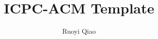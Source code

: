 \documentclass[11pt, a4paper, oneside]{ctexart}
\begin{document}
    \title{ICPC-ACM Template}
    \author{Ruoyi Qiao}
    \maketitle
    \restoregeometry

    \tableofcontents
    \clearpage

    
    \clearpage

    
    \clearpage

    
    \clearpage

    
    \clearpage

    
    \clearpage

    
    \clearpage

    
    \clearpage

\end{document}
